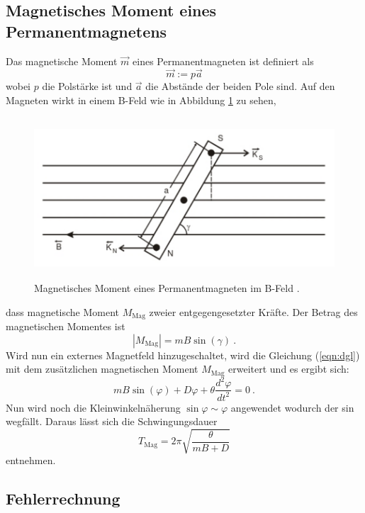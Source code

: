 \subsection{Magnetisches Moment eines Permanentmagnetens}
Das magnetische Moment $\vec{m}$ eines Permanentmagneten ist definiert als
\begin{equation}
  \vec{m} := p \vec{a}
  \label{eqn:m}
\end{equation}
wobei $p$ die Polstärke ist und $\vec{a}$ die Abstände der beiden Pole sind. Auf den Magneten wirkt in einem B-Feld wie in Abbildung \ref{fig:MagM} zu sehen,
\begin{figure}
  \centering
  \includegraphics[height=6cm]{picture/MagM.png}
  \caption{Magnetisches Moment eines Permanentmagneten im B-Feld \cite{sample}.}
  \label{fig:MagM}
\end{figure}
dass magnetische Moment $M_\text{Mag}$ zweier entgegengesetzter Kräfte. Der Betrag des magnetischen Momentes ist
\begin{equation}
  |M_\text{Mag}| = m B \sin(\gamma) \ .
  \label{eqn:MM}
\end{equation}
Wird nun ein externes Magnetfeld hinzugeschaltet, wird die Gleichung (\ref{eqn:dgl}) mit dem zusätzlichen magnetischen Moment $M_\text{Mag}$ erweitert und es ergibt sich:
\begin{equation}
  mB \sin(\varphi) + D \varphi + \theta \frac{d^2 \varphi}{dt^2} = 0 \ .
  \label{eqn:idgl}
\end{equation}
Nun wird noch die Kleinwinkelnäherung $\sin \varphi \sim \varphi$ angewendet wodurch der sin wegfällt. Daraus lässt sich die Schwingungsdauer
\begin{equation}
  T_\text{Mag} = 2 \pi \sqrt{\frac{\theta}{mB + D}}
  \label{eqn:Tmag}
\end{equation}
entnehmen.
\subsection{Fehlerrechnung}
